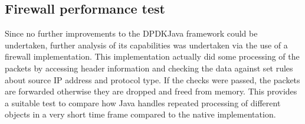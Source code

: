 \documentclass[final_report.tex]{subfiles}
\begin{document}

\subsection{Firewall performance test}
Since no further improvements to the DPDKJava framework could be undertaken, further analysis of its capabilities was undertaken via the use of a firewall implementation. This implementation actually did some processing of the packets by accessing header information and checking the data against set rules about source IP address and protocol type. If the checks were passed, the packets are forwarded otherwise they are dropped and freed from memory. This provides a suitable test to compare how Java handles repeated processing of different objects in a very short time frame compared to the native implementation.
\end{document}
